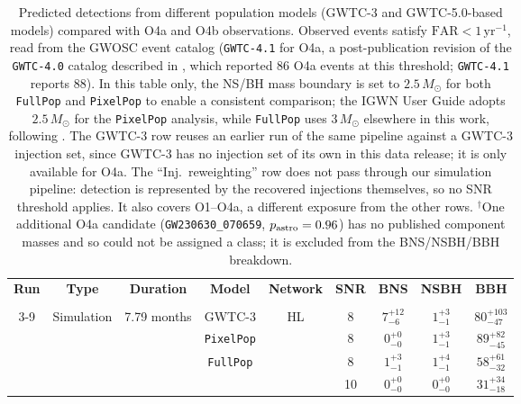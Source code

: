\begin{table}
\renewcommand\arraystretch{1.3}
\setlength{\tabcolsep}{0.4cm}
\centering
\caption{Predicted detections from different population models (GWTC-3 and GWTC-5.0-based models) compared with O4a and O4b observations. Observed events satisfy $\mathrm{FAR} < 1\,\mathrm{yr}^{-1}$, read from the GWOSC event catalog (\texttt{GWTC-4.1} for O4a, a post-publication revision of the \texttt{GWTC-4.0} catalog described in \citet{gwtc4_results}, which reported 86 O4a events at this threshold; \texttt{GWTC-4.1} reports 88).
In this table only, the NS/BH mass boundary is set to $2.5\,M_\odot$ for both \texttt{FullPop} and \texttt{PixelPop} to enable a consistent comparison; the IGWN User Guide adopts $2.5\,M_\odot$ for the \texttt{PixelPop} analysis, while \texttt{FullPop} uses $3\,M_\odot$ elsewhere in this work, following \citet{Kiendrebeogo_2023}. The GWTC-3 row reuses an earlier run of the same pipeline against a GWTC-3 injection set, since GWTC-3 has no injection set of its own in this data release; it is only available for O4a. The ``Inj.\ reweighting'' row does not pass through our simulation pipeline: detection is represented by the recovered injections themselves, so no SNR threshold applies. It also covers O1--O4a, a different exposure from the other rows. $^\dagger$One additional O4a candidate (\texttt{GW230630\_070659}, $p_{\rm astro}=0.96$) has no published component masses and so could not be assigned a class; it is excluded from the BNS/NSBH/BBH breakdown.}
\begin{tabular}{ccccccccc}
\hline
\Xhline{3\arrayrulewidth}
\textbf{Run} & \textbf{Type} & \textbf{Duration} & \textbf{Model} & \textbf{Network} & \textbf{SNR} & \textbf{BNS} & \textbf{NSBH} & \textbf{BBH} \\
\Xhline{3\arrayrulewidth}
\multicolumn{9}{c}{\textit{Number of detections}} \\
\hline
\cline{3-9}
\multirow{4}{*}{\textbf{O4a}} & \multirow{4}{*}{Simulation} & \multirow{4}{*}{7.79 months}
 & GWTC-3 & \multirow{4}{*}{HL} &         8& $7^{+12}_{-6}$ & $1^{+3}_{-1}$ & $80^{+103}_{-47}$ \\
&  &  & \texttt{PixelPop}  &  & 8& $0^{+0}_{-0}$ & $1^{+3}_{-1}$ & $89^{+82}_{-45}$ \\
 &  &  & \multirow{2}{*}{\texttt{FullPop}} &  & 8& $1^{+3}_{-1}$ & $1^{+4}_{-1}$ & $58^{+61}_{-32}$ \\
 &  &  &                                   &  & 10& $0^{+0}_{-0}$ & $0^{+0}_{-0}$ & $31^{+34}_{-18}$ \\


\end{tabular}
\end{table}
